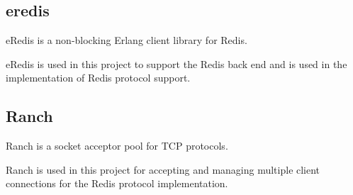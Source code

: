 \subsection{eredis}

eRedis \citep{eredis} is a non-blocking Erlang client library for Redis.

eRedis is used in this project to support the Redis back end and is used in the
implementation of Redis protocol support.

\subsection{Ranch}

Ranch \citep{ranch} is a socket acceptor pool for TCP protocols.

Ranch is used in this project for accepting and managing multiple client
connections for the Redis protocol implementation.

